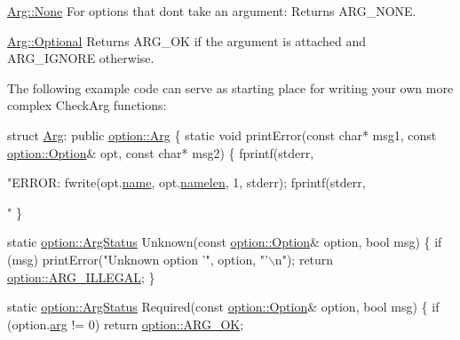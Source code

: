 \begin{DoxyItemize}
\item {\ttfamily \hyperlink{structoption_1_1Arg_a7fc01987899c91c6b6a1be5711a46e22}{Arg\+::\+None}} For options that don\textquotesingle{}t take an argument\+: Returns A\+R\+G\+\_\+\+N\+O\+NE. \item {\ttfamily \hyperlink{structoption_1_1Arg_aadb5316ecbc9eb0a7f0019d14bf35ad0}{Arg\+::\+Optional}} Returns A\+R\+G\+\_\+\+OK if the argument is attached and A\+R\+G\+\_\+\+I\+G\+N\+O\+RE otherwise.\end{DoxyItemize}
The following example code can serve as starting place for writing your own more complex Check\+Arg functions\+: 
\begin{DoxyCode}
\textcolor{keyword}{struct }\hyperlink{structArg}{Arg}: \textcolor{keyword}{public} \hyperlink{structoption_1_1Arg}{option::Arg}
\{
  \textcolor{keyword}{static} \textcolor{keywordtype}{void} printError(\textcolor{keyword}{const} \textcolor{keywordtype}{char}* msg1, \textcolor{keyword}{const} \hyperlink{classoption_1_1Option}{option::Option}& opt, \textcolor{keyword}{const} \textcolor{keywordtype}{char}* msg2)
  \{
    fprintf(stderr, \textcolor{stringliteral}{"ERROR: %
    fwrite(opt.\hyperlink{classoption_1_1Option_a02a76b4896abd22d0ba8514362261de9}{name}, opt.\hyperlink{classoption_1_1Option_a3aa2957b19ad5815873441b415d56050}{namelen}, 1, stderr);
    fprintf(stderr, \textcolor{stringliteral}{"%
  \}

  \textcolor{keyword}{static} \hyperlink{namespaceoption_aee8c76a07877335762631491e7a5a1a9}{option::ArgStatus} Unknown(\textcolor{keyword}{const} \hyperlink{classoption_1_1Option}{option::Option}& option, \textcolor{keywordtype}{bool} msg)
  \{
    \textcolor{keywordflow}{if} (msg) printError(\textcolor{stringliteral}{"Unknown option '"}, option, \textcolor{stringliteral}{"'\(\backslash\)n"});
    \textcolor{keywordflow}{return} \hyperlink{namespaceoption_aee8c76a07877335762631491e7a5a1a9a9528e32563b795bd2930b12d0a5e382d}{option::ARG\_ILLEGAL};
  \}

  \textcolor{keyword}{static} \hyperlink{namespaceoption_aee8c76a07877335762631491e7a5a1a9}{option::ArgStatus} Required(\textcolor{keyword}{const} \hyperlink{classoption_1_1Option}{option::Option}& option, \textcolor{keywordtype}{bool} msg)
  \{
    \textcolor{keywordflow}{if} (option.\hyperlink{classoption_1_1Option_a402be734987458364b0f473acae36238}{arg} != 0)
      \textcolor{keywordflow}{return} \hyperlink{namespaceoption_aee8c76a07877335762631491e7a5a1a9a445e08cb1747e5a22929e7ef2da43b55}{option::ARG\_OK};

}}
\end{DoxyCode}
